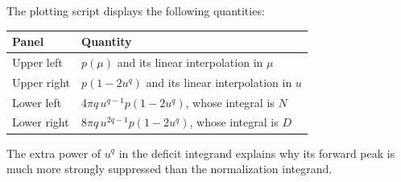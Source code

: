 \documentclass[11pt]{article}
\begin{document}
The plotting script displays the following quantities:
\begin{center}
\begin{tabular}{ll}
\toprule
Panel & Quantity \\
\midrule
Upper left & $p(\mu)$ and its linear interpolation in $\mu$ \\
Upper right & $p(1-2u^q)$ and its linear interpolation in $u$ \\
Lower left & $4\pi q\,u^{q-1}p(1-2u^q)$, whose integral is $N$ \\
Lower right & $8\pi q\,u^{2q-1}p(1-2u^q)$, whose integral is $D$ \\
\bottomrule
\end{tabular}
\end{center}
The extra power of $u^q$ in the deficit integrand explains why its forward
peak is much more strongly suppressed than the normalization integrand.
\end{document}
